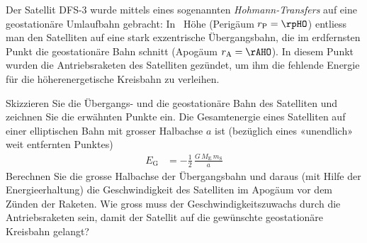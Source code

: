 Der Satellit DFS-3 wurde mittels eines sogenannten \emph{Hohmann-Transfers} auf eine geostationäre Umlaufbahn gebracht: In \hDFO\ Höhe (Perigäum $r_\mathrm{P} = \rpHO$) entliess man den Satelliten auf eine stark exzentrische Übergangsbahn, die im erdfernsten Punkt die geostationäre Bahn schnitt (Apogäum $r_\mathrm{A} = \rAHO$). In diesem Punkt wurden die Antriebsraketen des Satelliten gezündet, um ihm die fehlende Energie für die höherenergetische Kreisbahn zu verleihen.

\begin{abcliste}
\abc Skizzieren Sie die Übergangs- und die geostationäre Bahn des Satelliten und zeichnen Sie die erwähnten Punkte ein.
\abc Die Gesamtenergie eines Satelliten auf einer elliptischen Bahn mit grosser Halbachse $a$ ist (bezüglich eines «unendlich» weit entfernten Punktes)
\begin{align}
 E_\mathrm{G} &= -\frac{1}{2}\,\frac{G\,M_\mathrm{E}\,m_\mathrm{S}}{a}
\end{align}
Berechnen Sie die grosse Halbachse der Übergangsbahn und daraus (mit Hilfe der Energieerhaltung) die Geschwindigkeit des Satelliten im Apogäum vor dem Zünden der Raketen.
\abc Wie gross muss der Geschwindigkeitszuwachs durch die Antriebsraketen sein, damit der Satellit auf die gewünschte geostationäre Kreisbahn gelangt?
\end{abcliste}

